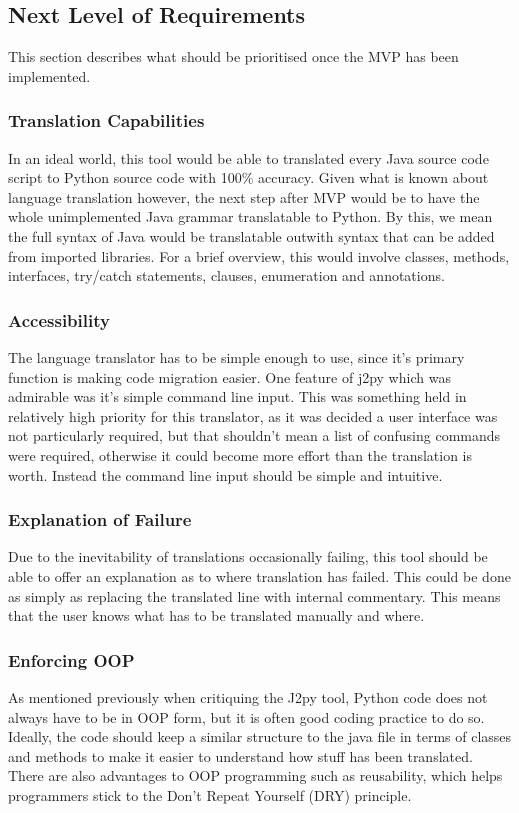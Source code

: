 \documentclass{l4proj}
\begin{document}
\subsection{Next Level of Requirements}
This section describes what should be prioritised once the MVP has been implemented.

\subsubsection{Translation Capabilities} In an ideal world, this tool would be able to translated every Java source code script to Python source code with 100\% accuracy. Given what is known about language translation however, the next step after MVP would be to have the whole unimplemented Java grammar translatable to Python. By this, we mean the full syntax of Java would be translatable outwith syntax that can be added from imported libraries. For a brief overview, this would involve classes, methods, interfaces, try/catch statements, clauses, enumeration and annotations.

\subsubsection{Accessibility}
The language translator has to be simple enough to use, since it's primary function is making code migration easier. One feature of j2py which was admirable was it's simple command line input. This was something held in relatively high priority for this translator, as it was decided a user interface was not particularly required, but that shouldn't mean a list of confusing commands were required, otherwise it could become more effort than the translation is worth. Instead the command line input should be simple and intuitive.

\subsubsection{Explanation of Failure}
Due to the inevitability of translations occasionally failing, this tool should be able to offer an explanation as to where translation has failed. This could be done as simply as replacing the translated line with internal commentary. This means that the user knows what has to be translated manually and where.

\subsubsection{Enforcing OOP}
As mentioned previously when critiquing the J2py tool, Python code does not always have to be in OOP form, but it is often good coding practice to do so. Ideally, the code should keep a similar structure to the java file in terms of classes and methods to make it easier to understand how stuff has been translated. There are also advantages to OOP programming such as reusability, which helps programmers stick to the Don't Repeat Yourself (DRY) principle.
\end{document}
